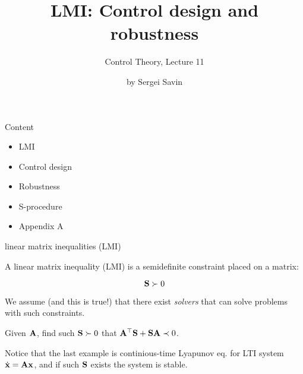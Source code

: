 \documentclass{beamer}
\title{LMI: Control design and robustness}
\subtitle{Control Theory, Lecture 11}
\author{by Sergei Savin}
\date{\mydate}
\begin{document}
\maketitle



\begin{frame}{Content}
\begin{itemize}
\item LMI
\item Control design
\item Robustness
\item S-procedure
\item Appendix A
\end{itemize}
\end{frame}




\begin{frame}{linear matrix inequalities (LMI)}
\begin{flushleft}

A linear matrix inequality (LMI) is a semidefinite constraint placed on a matrix:

\begin{equation}
\mathbf{S} \succ 0
\end{equation}

We assume (and this is true!) that there exist \emph{solvers} that can solve problems with such constraints. 


\begin{example}
	Given $\mathbf{A}$, find such $\mathbf{S}\succ 0$ that $\mathbf{A}^\top\mathbf{S} + \mathbf{S}\mathbf{A} \prec 0$.
\end{example}

Notice that the last example is continious-time Lyapunov eq. for LTI system $\dot{\mathbf{x}} = \mathbf{A}\mathbf{x}$, and if such $\mathbf{S}$ exists the system is stable. 

\end{flushleft}
\end{frame}
\end{document}
